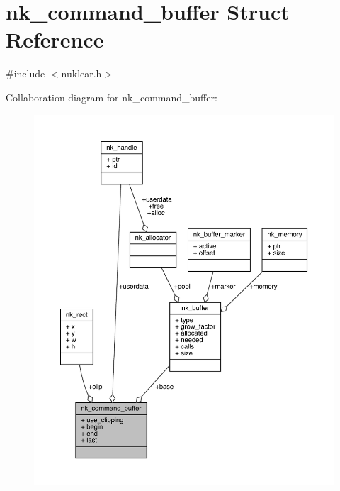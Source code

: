 \hypertarget{structnk__command__buffer}{}\section{nk\+\_\+command\+\_\+buffer Struct Reference}
\label{structnk__command__buffer}


{\ttfamily \#include $<$nuklear.\+h$>$}



Collaboration diagram for nk\+\_\+command\+\_\+buffer\+:
\nopagebreak
\begin{figure}[H]
\begin{center}
\leavevmode
\includegraphics[width=350pt]{structnk__command__buffer__coll__graph}
\end{center}
\end{figure}
